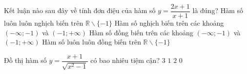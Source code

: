 \begin{ex}%
Kết luận nào sau đây về tính đơn điệu của hàm số $y=\dfrac{2x+1}{x+1}$ là đúng?
\choice
{Hàm số luôn luôn nghịch biến trên $\mathbb{R}\backslash \{-1 \} $}
{Hàm số nghịch biến trên các khoảng $(-\infty;-1)$ và $(-1;+\infty)$}
{\True Hàm số đồng biến trên các khoảng $(-\infty;-1)$ và $(-1;+\infty)$}
{Hàm số luôn luôn đồng biến trên $\mathbb{R}\backslash \{-1\}$}	
\end{ex}


\begin{ex}%
Đồ thị hàm số $y=\dfrac{x+1}{\sqrt{x^2-1}}$ có bao nhiêu tiệm cận?
\choice
{\True $3$}
{$1$}
{ $2$}
{$0$}
\end{ex}


